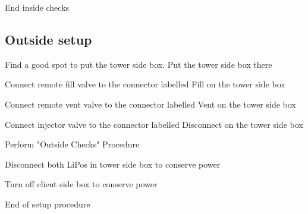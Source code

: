 End inside checks


\subsection{Outside setup}
\begin{checklist}
    \item Find a good spot to put the tower side box. Put the tower side box there
    \item Connect remote fill valve to the connector labelled Fill on the tower
side box
    \item Connect remote vent valve to the connector labelled Vent on the tower
side box
    \item Connect injector valve to the connector labelled Disconnect on the tower
side box
    \item Perform "Outside Checks" Procedure
    \item Disconnect both LiPos in tower side box to conserve power
    \item Turn off client side box to conserve power
\end{checklist}
End of setup procedure


